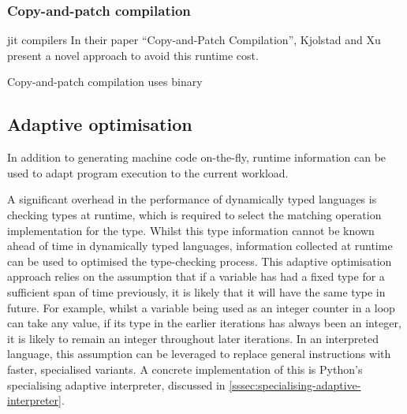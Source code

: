 
\subsubsection{Copy-and-patch compilation}
\label{sssec:copy-and-patch-compilation}

\ac{jit} compilers 
In their paper ``Copy-and-Patch Compilation'', Kjolstad and Xu present a novel approach to avoid this runtime cost.

Copy-and-patch compilation uses binary 






\subsection{Adaptive optimisation}
\label{ssec:adaptive-optimisation}

In addition to generating machine code on-the-fly, runtime information can be used to adapt program execution to the current workload.

A significant overhead in the performance of dynamically typed languages is checking types at runtime, which is required to select the matching operation implementation for the type.
Whilst this type information cannot be known ahead of time in dynamically typed languages, information collected at runtime can be used to optimised the type-checking process. This adaptive optimisation approach relies on the assumption that if a variable has had a fixed type for a sufficient span of time previously, it is likely that it will have the same type in future. For example, whilst a variable being used as an integer counter in a loop can take any value, if its type in the earlier iterations has always been an integer, it is likely to remain an integer throughout later iterations.
In an interpreted language, this assumption can be leveraged to replace general instructions with faster, specialised variants. A concrete implementation of this is Python's specialising adaptive interpreter, discussed in \autoref{sssec:specialising-adaptive-interpreter}.












